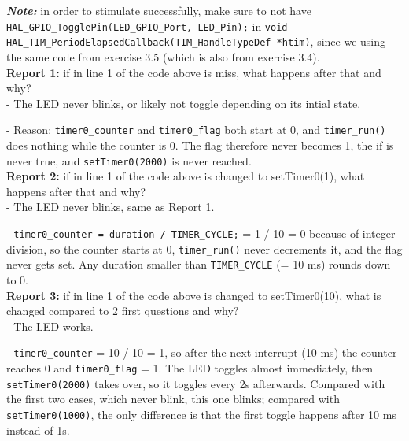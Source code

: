 \textbf{\textit{Note: }} in order to stimulate successfully, make sure to not have \texttt{HAL\_GPIO\_TogglePin(LED\_GPIO\_Port, LED\_Pin);} in \texttt{void HAL\_TIM\_PeriodElapsedCallback(TIM\_HandleTypeDef *htim)}, since we using the same code from exercise 3.5 (which is also from exercise 3.4). \\

\textbf{Report 1: } if in line 1 of the code above is miss, what happens after that and why?\\

- The LED never blinks, or likely not toggle depending on its intial state.

- Reason: \texttt{timer0\_counter} and \texttt{timer0\_flag} both start at 0, and \texttt{timer\_run()} does nothing while the counter is 0. The flag therefore never becomes 1, the if is never true, and \texttt{setTimer0(2000)} is never reached. \\

\textbf{Report 2: } if in line 1 of the code above is changed to setTimer0(1), what happens after that and why?\\

- The LED never blinks, same as Report 1.

- \texttt{timer0\_counter = duration / TIMER\_CYCLE;} = 1 / 10 = 0 because of integer division, so the counter starts at 0, \texttt{timer\_run()} never decrements it, and the flag never gets set. Any duration smaller than \texttt{TIMER\_CYCLE} (= 10 ms) rounds down to 0. \\

\textbf{Report 3: } if in line 1 of the code above is changed to setTimer0(10), what is changed compared to 2 first questions and why?\\

- The LED works.

- \texttt{timer0\_counter} = 10 / 10 = 1, so after the next interrupt (10 ms) the counter reaches 0 and \texttt{timer0\_flag} = 1. The LED toggles almost immediately, then \texttt{setTimer0(2000)} takes over, so it toggles every 2s afterwards. Compared with the first two cases, which never blink, this one blinks; compared with \texttt{setTimer0(1000)}, the only difference is that the first toggle happens after 10 ms instead of 1s. \\










